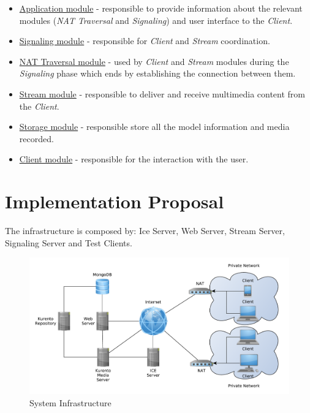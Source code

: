 \begin{itemize}

\item \underline{Application module} - responsible to provide information about the relevant modules (\emph{NAT Traversal} and \emph{Signaling}) and user interface to the \emph{Client}.

\item \underline{Signaling module} - responsible for \emph{Client} and \emph{Stream} coordination.

 \item \underline{NAT Traversal module} - used by \emph{Client} and \emph{Stream} modules during the \emph{Signaling} phase which ends by establishing the connection between them.

 \item \underline{Stream module} - responsible to deliver and receive multimedia content from the \emph{Client}. 

 \item \underline{Storage module} - responsible store all the model information and media recorded. 

 \item \underline{Client module} - responsible for the interaction with the user.

\end{itemize}




 
\section{Implementation Proposal}
The infrastructure is composed by: Ice Server, Web Server, Stream Server, Signaling Server and Test Clients.



\begin{figure}[H]
	\centering
	\includegraphics[width=\textwidth]{figures/infrastructure.pdf}
	\caption{System Infrastructure}
\end{figure}

